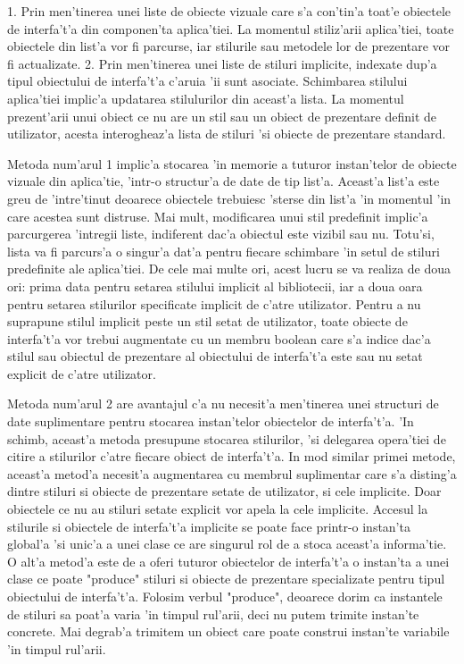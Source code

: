 1. Prin men'tinerea unei liste de obiecte vizuale care s'a con'tin'a toat'e obiectele de interfa't'a din componen'ta aplica'tiei. La momentul stiliz'arii aplica'tiei, toate obiectele din list'a vor fi parcurse, iar stilurile sau metodele lor de prezentare vor fi actualizate.
2. Prin men'tinerea unei liste de stiluri implicite, indexate dup'a tipul obiectului de interfa't'a c'aruia 'ii sunt asociate. Schimbarea stilului aplica'tiei implic'a updatarea stilulurilor din aceast'a lista. La momentul prezent'arii unui obiect ce nu are un stil sau un obiect de prezentare definit de utilizator, acesta interogheaz'a lista de stiluri 'si obiecte de prezentare standard.

Metoda num'arul 1 implic'a stocarea 'in memorie a tuturor instan'telor de obiecte vizuale din aplica'tie, 'intr-o structur'a de date de tip list'a. Aceast'a list'a este greu de 'intre'tinut deoarece obiectele trebuiesc 'sterse din list'a 'in momentul 'in care acestea sunt distruse. Mai mult, modificarea unui stil predefinit implic'a parcurgerea 'intregii liste, indiferent dac'a obiectul este vizibil sau nu. Totu'si, lista va fi parcurs'a o singur'a dat'a pentru fiecare schimbare 'in setul de stiluri predefinite ale aplica'tiei. De cele mai multe ori, acest lucru se va realiza de doua ori: prima data pentru setarea stilului implicit al bibliotecii, iar a doua oara pentru setarea stilurilor specificate implicit de c'atre utilizator. Pentru a nu suprapune stilul implicit peste un stil setat de utilizator, toate obiecte de interfa't'a vor trebui augmentate cu un membru boolean care s'a indice dac'a stilul sau obiectul de prezentare al obiectului de interfa't'a este sau nu setat explicit de c'atre utilizator.

Metoda num'arul 2 are avantajul c'a nu necesit'a men'tinerea unei structuri de date suplimentare pentru stocarea instan'telor obiectelor de interfa't'a. 'In schimb, aceast'a metoda presupune stocarea stilurilor, 'si delegarea opera'tiei de citire a stilurilor c'atre fiecare obiect de interfa't'a. In mod similar primei metode, aceast'a metod'a necesit'a augmentarea cu membrul suplimentar care s'a disting'a dintre stiluri si obiecte de prezentare setate de utilizator, si cele implicite. Doar obiectele ce nu au stiluri setate explicit vor apela la cele implicite. Accesul la stilurile si obiectele de interfa't'a implicite se poate face printr-o instan'ta global'a 'si unic'a a unei clase ce are singurul rol de a stoca aceast'a informa'tie. O alt'a metod'a este de a oferi tuturor obiectelor de interfa't'a o instan'ta a unei clase ce poate "produce" stiluri si obiecte de prezentare specializate pentru tipul obiectului de interfa't'a. Folosim verbul "produce", deoarece dorim ca instantele de stiluri sa poat'a varia 'in timpul rul'arii, deci nu putem trimite instan'te concrete. Mai degrab'a trimitem un obiect care poate construi instan'te variabile 'in timpul rul'arii.




